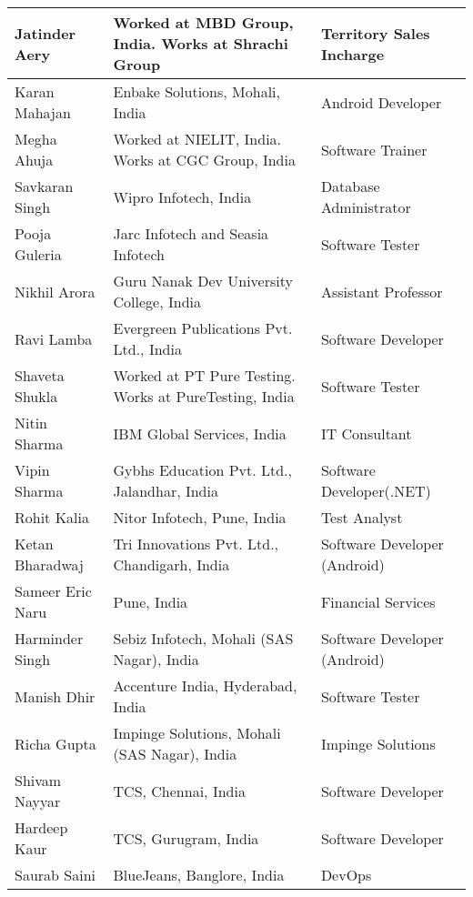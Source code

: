 \documentclass[margin,line]{res}
\begin{document}
\begin{resume}
\begin{center}
\begin{tabular}{ | p{3cm} | p{5cm} | l | }
    \hline    
    Jatinder Aery & Worked at MBD Group, India. Works at Shrachi Group & Territory Sales Incharge\\
    \hline    
    Karan Mahajan & Enbake Solutions, Mohali, India & Android Developer\\
    \hline
    Megha Ahuja & Worked at NIELIT, India. Works at CGC Group, India & Software Trainer\\
    \hline
    Savkaran Singh & Wipro Infotech, India & Database Administrator\\
    \hline
    Pooja Guleria & Jarc Infotech and Seasia Infotech & Software Tester\\
    \hline
    Nikhil Arora & Guru Nanak Dev University College, India & Assistant Professor\\
    \hline
    Ravi Lamba & Evergreen Publications Pvt. Ltd., India & Software Developer\\
    \hline
    Shaveta Shukla & Worked at PT Pure Testing. Works at PureTesting, India & Software Tester\\
    \hline 
    Nitin Sharma & IBM Global Services, India & IT Consultant\\
    \hline
    Vipin Sharma & Gybhs Education Pvt. Ltd., Jalandhar, India & Software Developer(.NET)\\
    \hline
    Rohit Kalia & Nitor Infotech, Pune, India & Test Analyst\\
    \hline
    Ketan Bharadwaj & Tri Innovations Pvt. Ltd., Chandigarh, India & Software Developer (Android)\\
    \hline
    Sameer Eric Naru & Pune, India & Financial Services\\
    \hline
    Harminder Singh & Sebiz Infotech, Mohali (SAS Nagar), India & Software Developer (Android)\\
    \hline
    Manish Dhir & Accenture India, Hyderabad, India & Software Tester\\
    \hline
    Richa Gupta & Impinge Solutions,  Mohali (SAS Nagar), India & Impinge Solutions\\
    \hline
    Shivam Nayyar & TCS, Chennai, India & Software Developer\\
    \hline
	Hardeep Kaur & TCS, Gurugram, India & Software Developer\\
	\hline
	Saurab Saini & BlueJeans, Banglore, India & DevOps\\
	\hline
    \end{tabular}
    
\end{center}

\end{resume}
\end{document}
